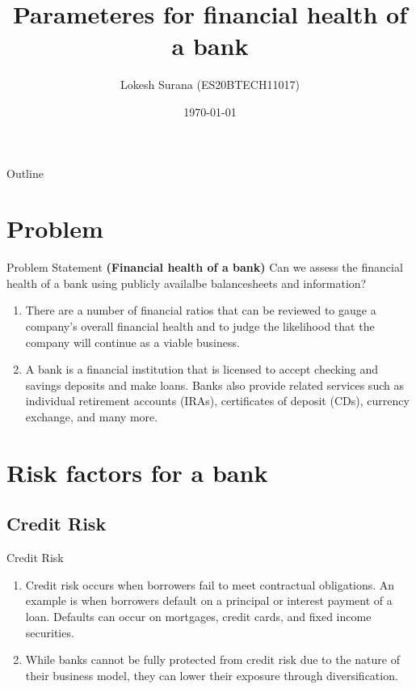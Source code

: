\documentclass{beamer}
\title{Parameteres for financial health of a bank}
\author{Lokesh Surana (ES20BTECH11017)}
\date{\today}
\begin{document}
\begin{frame}
    \titlepage 
\end{frame}

\begin{frame}{Outline}
    \tableofcontents
\end{frame}

\section{Problem}
\begin{frame}{Problem Statement}
	\textbf{(Financial health of a bank)} Can we assess the financial health of a bank using publicly availalbe balancesheets and information?
	\begin{enumerate}
		\item There are a number of financial ratios that can be reviewed to gauge a company's overall financial health and to judge the likelihood that the company will continue as a viable business.
		\item A bank is a financial institution that is licensed to accept checking and savings deposits and make loans. Banks also provide related services such as individual retirement accounts (IRAs), certificates of deposit (CDs), currency exchange, and many more.
	\end{enumerate}
\end{frame}

\section{Risk factors for a bank}
\subsection{Credit Risk}
\begin{frame}{Credit Risk}
	\begin{enumerate}
	\item Credit risk occurs when borrowers fail to meet contractual obligations. An example is when borrowers default on a principal or interest payment of a loan. Defaults can occur on mortgages, credit cards, and fixed income securities.
	\item While banks cannot be fully protected from credit risk due to the nature of their business model, they can lower their exposure through diversification.
	\end{enumerate}
\end{frame}
\end{document}
